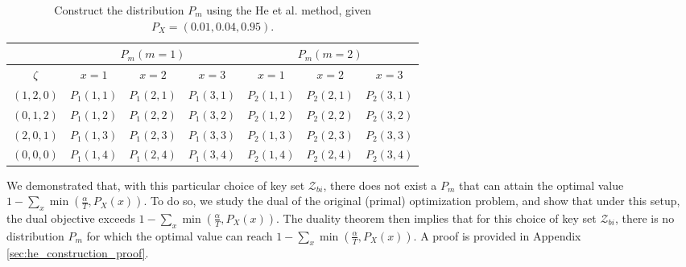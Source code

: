 \documentclass[11pt,letterpaper]{article}
\newcommand{\cZ}{\mathcal{Z}}
\begin{document}
\begin{table}[]
\centering
\begin{tabular}{c||ccc||ccc}

            & \multicolumn{3}{c||}{$P_m (m=1)$}                                                            & \multicolumn{3}{c}{$P_m (m=2)$}                                                                          \\ \hline
$\zeta$     & \multicolumn{1}{c|}{$x=1$}                                           & \multicolumn{1}{c|}{$x=2$}                    & $x=3$                    & \multicolumn{1}{c|}{$x=1$}                    & \multicolumn{1}{c|}{$x=2$}                    & $x=3$                    \\ \hline
$(1,2,0)$ & \multicolumn{1}{c|}{\cellcolor{yellow!25}$P_1(1,1)$} & \multicolumn{1}{c|}{$P_1(2,1)$}                         &   $P_1(3,1)$                       & \multicolumn{1}{c|}{$P_2(1,1)$}                         & \multicolumn{1}{c|}{\cellcolor{yellow!25}$P_2(2,1)$} &  $P_2(3,1)$                        \\ \hline
$(0,1,2)$ & \multicolumn{1}{c|}{$P_1(1,2)$}                                                & \multicolumn{1}{c|}{\cellcolor{yellow!25}$P_1(2,2)$} &          $P_1(3,2)$                & \multicolumn{1}{c|}{$P_2(1,2)$} & \multicolumn{1}{c|}{$P_2(2,2)$}                         &  $P_2(3,2)$\cellcolor{yellow!25}                        \\ \hline
$(2,0,1)$ & \multicolumn{1}{c|}{$P_1(1,3)$}                                                & \multicolumn{1}{c|}{$P_1(2,3)$} &    \cellcolor{yellow!25}$P_1(3,3)$                     & \multicolumn{1}{c|}{\cellcolor{yellow!25}$P_2(1,3)$}                         & \multicolumn{1}{c|}{$P_2(2,3)$}                         & $P_2(3,3)$ \\ \hline
$(0,0,0)$ & \multicolumn{1}{c|}{$P_1(1,4)$}                                                & \multicolumn{1}{c|}{$P_1(2,4)$}                         &       $P_1(3,4)$                   & \multicolumn{1}{c|}{$P_2(1,4)$}                         & \multicolumn{1}{c|}{$P_2(2,4)$}                         &  $P_2(3,4)$                        \\ \hline
\end{tabular}
\caption{Construct the distribution $P_m$ using the He et al. method, given $P_X = (0.01, 0.04, 0.95)$.}
\label{tab:construct_pm_he}
\end{table}

We demonstrated that, with this particular choice of key set $\cZ_{bi}$, there does not exist a $P_m$ that can attain the optimal value $1-\sum_x \min(\tfrac{\alpha}{T}, P_X(x))$. To do so, we study the dual of the original (primal) optimization problem, and show that under this setup, the dual objective exceeds $1-\sum_x \min(\tfrac{\alpha}{T}, P_X(x))$. The duality theorem then implies that for this choice of key set $\cZ_{bi}$, there is no distribution $P_m$ for which the optimal value can reach $1-\sum_x \min(\tfrac{\alpha}{T}, P_X(x))$. A proof is provided in Appendix \ref{sec:he_construction_proof}.
\end{document}
